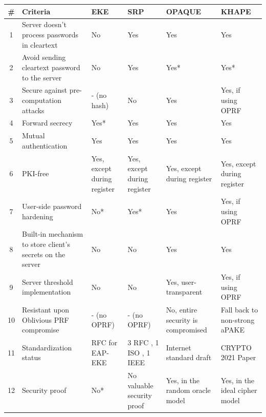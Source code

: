 \documentclass[../report.tex]{subfiles}
\begin{document}
\begin{center}
   \begin{tabular}{ | c | p{5cm} || p{2cm} | p{2cm} | p{2cm} | p{2cm} | }
     \hline
     \textbf{\#} & \textbf{Criteria} & \textbf{EKE} & \textbf{SRP} & \textbf{OPAQUE} & \textbf{KHAPE} \\ \hline
     
     
     
     1 & Server doesn't process passwords in cleartext & No & Yes & Yes & Yes \\ \hline
     2 & Avoid sending cleartext password to the server & No & Yes & Yes* & Yes* \\ \hline
     
     3 & Secure against pre-computation attacks & - (no hash) & No & Yes & Yes, if using OPRF \\ \hline
     4 & Forward secrecy & Yes* & Yes & Yes & Yes \\ \hline
     5 & Mutual authentication & Yes & Yes & Yes & Yes \\ \hline
     6 & PKI-free & Yes, except during register & Yes, except during register & Yes, except during register & Yes, except during register \\ \hline
     7 & User-side password hardening & No* & Yes* & Yes & Yes, if using OPRF \\ \hline
     8 & Built-in mechanism to store client's secrets on the server & No & No & Yes & Yes \\ \hline
     9 & Server threshold implementation & No & No & Yes, user-transparent & Yes, if using OPRF \\ \hline
     10 & Resistant upon Oblivious PRF compromise & - (no OPRF) & - (no OPRF) & No, entire security is compromised & Fall back to non-strong aPAKE \\ \hline
     11 & Standardization status & RFC for EAP-EKE \cite{EAP_EKE_RFC} & 3 RFC \cite{SRP_RFC_1, SRP_RFC_2, SRP_RFC_3}, 1 ISO \cite{SRP_ISO}, 1 IEEE \cite{SRP_IEEE} & Internet standard draft \cite{OPAQUE_Standard_Draft} & CRYPTO 2021 Paper \cite{KHAPE_Paper} \\ \hline
     12 & Security proof & No* & No valuable security proof & Yes, in the random oracle model & Yes, in the ideal cipher model \\ \hline
     
     \end{tabular}
 \end{center}
 
\end{document}

